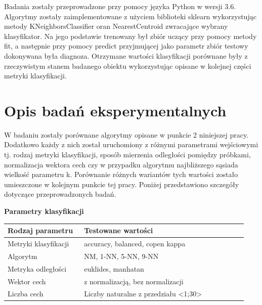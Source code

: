 \documentclass[12pt]{article}
\begin{document}
\indent Badania zostały przeprowadzone przy pomocy języka Python w wersji 3.6. Algorytmy zostały zaimplementowane z użyciem biblioteki sklearn wykorzystując metody KNeighborsClassifier oran NearestCentroid zwracające wybrany klasyfikator. Na jego podstawie trenowany był zbiór uczący przy pomocy metody fit, a następnie przy pomocy predict przyjmującej jako parametr zbiór testowy dokonywana była diagnoza. Otrzymane wartości klasyfikacji porównane były z rzeczywistym stanem badanego obiektu wykorzystując opisane w kolejnej części metryki klasyfikacji.


\section{Opis badań eksperymentalnych}
\indent W badaniu zostały porównane algorytmy opisane w punkcie 2 niniejszej pracy. Dodatkowo każdy z nich został uruchomiony z różnymi parametrami wejściowymi tj. rodzaj metryki klasyfikacji, sposób mierzenia odległości pomiędzy próbkami, normalizacja wektora cech czy w przypadku algorytmu najbliższego sąsiada wielkość parametru k. Porównanie różnych wariantów tych wartości zostało umieszczone w kolejnym punkcie tej pracy. Poniżej przedstawiono szczegóły dotyczące przeprowadzonych badań.\\

\centerline{\textbf{Parametry klasyfikacji}}
\begin{table}[H]
	\begin{tabular}{|p{0.3\linewidth}|p{0.64\linewidth}|}%
	\hline\centering
	Rodzaj parametru 	& Testowane wartości 		\\ \hline\centering
	Metryki klasyfikacji	& accuracy, balanced, copen kappa \\ \hline\centering
	Algorytm	& NM, 1-NN, 5-NN, 9-NN \\ \hline\centering
	Metryka odległości	& euklides, manhatan \\ \hline\centering
	Wektor cech	& z normalizacją, bez normalizacji \\ \hline\centering
	Liczba cech	& Liczby naturalne z przedziału <1;30> \\ \hline
	\end{tabular}
\end{table}
\end{document}
